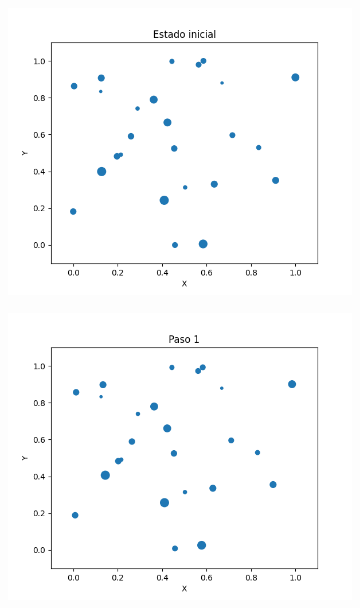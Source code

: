 \documentclass{report}
\begin{document}
\begin{figure}[h]
\centering
     \begin{subfigure}[b]{0.3\textwidth}
         \centering
         \includegraphics[width=\textwidth]{Images/Images_m/p9pm_t0.png}
     \end{subfigure}
     \begin{subfigure}[b]{0.3\textwidth}
         \centering
         \includegraphics[width=\textwidth]{Images/Images_m/p9pm_t01.png}
     \end{subfigure}
     \begin{subfigure}[b]{0.3\textwidth}

\end{subfigure}
\end{figure}
\end{document}
